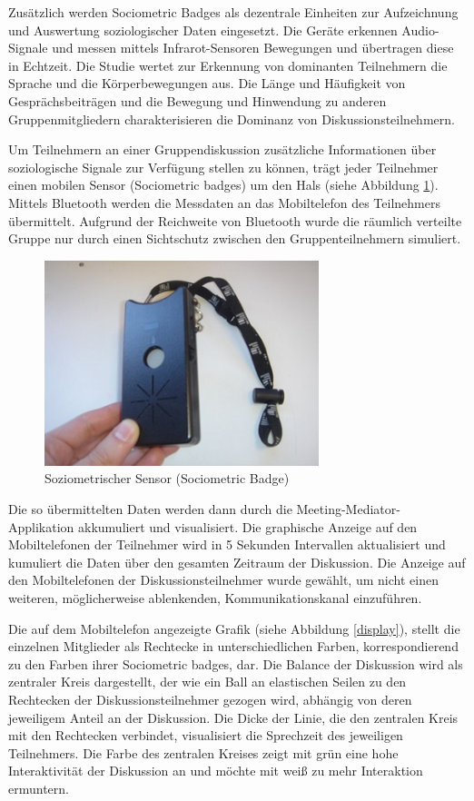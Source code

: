 Zu\-sätz\-lich werden Sociometric Badges \cite{MITbadge} als dezentrale
Einheiten zur Aufzeichnung und Auswertung soziologischer Daten eingesetzt.
Die Geräte erkennen Audio-Signale und messen mittels Infrarot-Sen\-so\-ren
Bewegungen und ü\-ber\-tra\-gen diese in Echtzeit.
Die Studie \cite{KimChaHolPent2008} wertet zur Erkennung von dominanten
Teilnehmern die Sprache und die Kör\-per\-be\-we\-gun\-gen aus. Die Län\-ge und Häu\-fig\-keit von
Ge\-sprächs\-bei\-trä\-gen und die Bewegung und Hinwendung zu anderen
Gruppenmitgliedern charakterisieren die Dominanz von Diskussionsteilnehmern.
 
Um Teilnehmern an einer Gruppendiskussion zusätzliche Informationen über
soziologische Signale zur Verfügung stellen zu können, trägt jeder Teilnehmer
einen mobilen Sensor (Sociometric badges) um den Hals (siehe Abbildung
\ref{badge}).
 Mittels Bluetooth werden die Messdaten an das Mobiltelefon des
Teilnehmers übermittelt. Aufgrund der Reichweite von Bluetooth wurde die
räumlich verteilte Gruppe nur durch einen Sichtschutz zwischen den
Gruppenteilnehmern simuliert.

\begin{figure}[htp]
\centering
\includegraphics[width=8cm]{sociometricbadge.jpg}
\caption{Soziometrischer Sensor (Sociometric Badge) \protect\cite{MITbadge}}
\label{badge}
\end{figure}

Die so übermittelten Daten werden dann durch die Meeting-Mediator-Applikation
akkumuliert und visualisiert.
Die graphische Anzeige auf den Mobiltelefonen der Teilnehmer wird in 5 Sekunden
Intervallen aktualisiert und kumuliert die Daten über den gesamten Zeitraum der
Diskussion.
Die Anzeige auf den Mobiltelefonen der Diskussionsteilnehmer wurde gewählt, um
nicht einen weiteren, mög\-li\-cher\-wei\-se ablenkenden, Kommunikationskanal
ein\-zu\-füh\-ren.

Die auf dem Mobiltelefon angezeigte Grafik (siehe Abbildung \ref{display}),
stellt die einzelnen Mitglieder als Rechtecke in unterschiedlichen Farben,
korrespondierend zu den Farben ihrer Sociometric badges, dar. Die Balance der
Diskussion wird als zentraler Kreis dargestellt, der wie ein Ball an elastischen
Seilen zu den Rechtecken der Diskussionsteilnehmer gezogen wird, abhängig von
deren jeweiligem Anteil an der Diskussion. Die Dicke der Linie, die den
zentralen Kreis mit den Rechtecken verbindet, visualisiert die Sprechzeit des
jeweiligen Teilnehmers. Die Farbe des zentralen Kreises zeigt mit grün eine hohe
Interaktivität der Diskussion an und möchte mit weiß zu mehr Interaktion
ermuntern.

